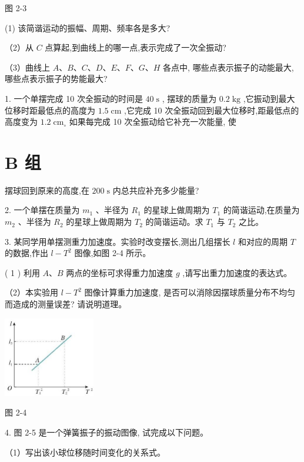 \documentclass[10pt]{article}
\begin{document}
图 2-3

(1) 该简谐运动的振幅、周期、频率各是多大?

（2）从 \(C\) 点算起,到曲线上的哪一点,表示完成了一次全振动?

（3）曲线上 \(A\text{、}B\text{、}C\text{、}D\text{、}E\text{、}F\text{、}G\text{、}H\) 各点中, 哪些点表示振子的动能最大, 哪些点表示振子的势能最大?

1. 一个单摆完成 10 次全振动的时间是 \({40}\mathrm{\;s}\) , 摆球的质量为 \({0.2}\mathrm{\;{kg}}\) ,它振动到最大位移时距最低点的高度为 \({1.5}\mathrm{\;{cm}}\) ,它完成 10 次全振动回到最大位移时,距最低点的高度变为 \({1.2}{\mathrm{\;{cm}}}_{ \circ }\) 如果每完成 10 次全振动给它补充一次能量, 使

\section*{B 组}

摆球回到原来的高度,在 \({200}\mathrm{\;s}\) 内总共应补充多少能量?

2. 一个单摆在质量为 \({m}_{1}\) 、半径为 \({R}_{1}\) 的星球上做周期为 \({T}_{1}\) 的简谐运动,在质量为 \({m}_{2}\) 、半径为 \({R}_{2}\) 的星球上做周期为 \({T}_{2}\) 的简谐运动。求 \({T}_{1}\) 与 \({T}_{2}\) 之比。

3. 某同学用单摆测重力加速度。实验时改变摆长,测出几组摆长 \(l\) 和对应的周期 \(T\) 的数据,作出 \(l - {T}^{2}\) 图像,如图 2-4 所示。

( 1 ) 利用 \(A\text{、}B\) 两点的坐标可求得重力加速度 \(g\) ,请写出重力加速度的表达式。

（2）本实验用 \(l - {T}^{2}\) 图像计算重力加速度, 是否可以消除因摆球质量分布不均匀而造成的测量误差? 请说明道理。

\begin{center}
\includegraphics[max width=0.3\textwidth]{images/01910e4c-ebb8-7d2c-8f2f-2375bc1d2d12_65_867806.jpg}
\end{center}

图 2-4

4. 图 2-5 是一个弹簧振子的振动图像, 试完成以下问题。

（1）写出该小球位移随时间变化的关系式。
\end{document}
